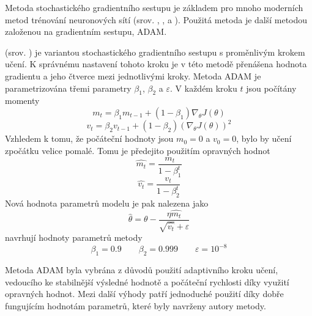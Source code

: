 Metoda stochastického gradientního sestupu je základem pro mnoho moderních metod trénování neuronových sítí (srov. \cite{duchi_adaptive_2011}, \cite{zeiler_adadelta:_2012}, \cite{tieleman_lecture_2012} a \cite{kingma_adam:_2014}). Použitá metoda je další metodou založenou na gradientním sestupu, ADAM.

 (srov. \cite{kingma_adam:_2014}) je variantou stochastického gradientního sestupu s proměnlivým krokem učení. K správnému nastavení tohoto kroku je v této metodě přenášena hodnota gradientu a jeho čtverce mezi jednotlivými kroky. Metoda ADAM je parametrizována třemi parametry \( \beta_1 \), \( \beta_2 \) a \( \varepsilon \). V každém kroku \( t \) jsou počítány momenty
\[ m_t = \beta_1 m_{t - 1} + \left( 1 - \beta_1 \right) \nabla_{\theta} J \left( \theta \right) \]
\[ v_t = \beta_2 v_{t - 1} + \left( 1 - \beta_2 \right) \left( \nabla_{\theta} J \left( \theta \right) \right)^2 \]
Vzhledem k tomu, že počáteční hodnoty jsou \( m_0 = 0 \) a \( v_0 = 0 \), bylo by učení zpočátku velice pomalé. Tomu je předejito použitím opravných hodnot
\[ \hat{m_t} = \frac{m_t}{1 - \beta_1^t} \]
\[ \hat{v_t} = \frac{v_t}{1 - \beta_2^t} \]
Nová hodnota parametrů modelu je pak nalezena jako
\[ \hat \theta = \theta - \frac{\eta \hat{m_t}}{\sqrt{\hat{v_t}} + \varepsilon} \]
\cite{kingma_adam:_2014} navrhují hodnoty parametrů metody
\[ \beta_1 = 0.9 \qquad \beta_2 = 0.999 \qquad \varepsilon = 10^{-8} \]

Metoda ADAM byla vybrána z důvodů použití adaptivního kroku učení, vedoucího ke stabilnější výsledné hodnotě a počáteční rychlosti díky využití opravných hodnot. Mezi další výhody patří jednoduché použití díky dobře fungujícím hodnotám parametrů, které byly navrženy autory metody.

